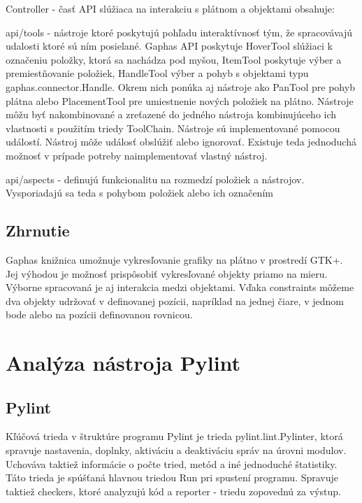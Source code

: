 \documentclass[11pt,oneside,final]{fithesis2}
\begin{document}
\begin{list}{•}{}
\item Controller - časť API slúžiaca na interakciu s plátnom a objektami obsahuje:
    \begin{list}{•}{}
		\item api/tools - nástroje ktoré poskytujú pohľadu interaktívnosť tým, že spracovávajú udalosti ktoré sú ním posielané. Gaphas API poskytuje HoverTool slúžiaci k označeniu položky, ktorá sa nachádza pod myšou, ItemTool poskytuje výber a premiestňovanie položiek, HandleTool výber a pohyb s objektami typu gaphas.connector.Handle. Okrem nich ponúka aj nástroje ako PanTool pre pohyb plátna alebo PlacementTool pre umiestnenie nových položiek na plátno. Nástroje môžu byť nakombinované a zreťazené do jedného nástroja kombinujúceho ich vlastnosti s použitím triedy ToolChain. Nástroje sú implementované pomocou událostí. Nástroj môže událosť obslúžiť alebo ignorovať. Existuje teda jednoduchá možnosť v prípade potreby naimplementovať vlastný nástroj.
		\item api/aspects - definujú funkcionalitu na rozmedzí položiek a nástrojov. Vysporiadajú sa teda s pohybom položiek alebo ich označením
    \end{list}


\end{list}



	\subsection{Zhrnutie}

		Gaphas knižnica umožnuje vykresľovanie grafiky na plátno v prostredí GTK+. Jej výhodou je možnosť prispôsobiť vykresľované objekty priamo na mieru. Výborne spracovaná je aj interakcia medzi objektami. Vďaka constraints môžeme dva objekty udržovať v definovanej pozícii, napríklad na jednej čiare, v jednom bode alebo na pozícii definovanou rovnicou.
    
    
\section{Analýza nástroja Pylint}

	\subsection{Pylint}
		Kľúčová trieda v štruktúre programu Pylint je trieda pylint.lint.Pylinter, ktorá spravuje nastavenia, doplnky, aktiváciu a deaktiváciu správ na úrovni modulov. Uchováva taktiež informácie o počte tried, metód a iné jednoduché štatistiky. Táto trieda je spúšťaná hlavnou triedou Run pri spustení programu. Spravuje taktiež checkers, ktoré analyzujú kód a reporter - triedu zopovednú za výstup. 
		
\end{document}
